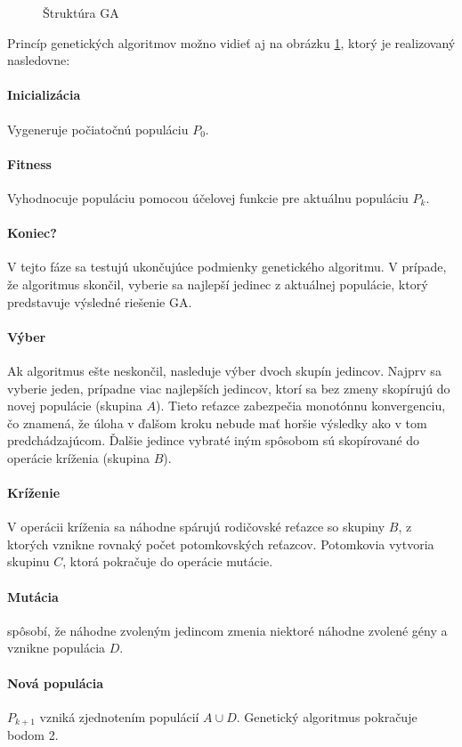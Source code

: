 \begin{figure}[!h]
  \centering
  
  \caption{Štruktúra GA}
  \label{img:ga}
\end{figure}


Princíp genetických algoritmov možno vidieť aj na obrázku \ref{img:ga}, ktorý je realizovaný nasledovne:
\paragraph{Inicializácia} Vygeneruje počiatočnú populáciu $ P_0 $.
\paragraph{Fitness} Vyhodnocuje populáciu pomocou účelovej funkcie pre aktuálnu populáciu $ P_k $.
\paragraph{Koniec?} V tejto fáze sa testujú ukončujúce podmienky genetického algoritmu.
V prípade, že algoritmus skončil, vyberie sa najlepší jedinec z aktuálnej populácie, ktorý predstavuje výsledné riešenie GA.
\paragraph{Výber} Ak algoritmus ešte neskončil, nasleduje výber dvoch skupín jedincov. Najprv sa vyberie jeden, prípadne viac najlepších jedincov, ktorí sa bez zmeny skopírujú
do novej populácie (skupina $ A $). Tieto reťazce zabezpečia monotónnu konvergenciu, čo znamená, že úloha v ďalšom kroku nebude mať horšie výsledky ako v tom predchádzajúcom.
Ďalšie jedince vybraté iným spôsobom sú skopírované do operácie kríženia (skupina $ B $).
\paragraph{Kríženie} V operácii kríženia sa náhodne spárujú rodičovské reťazce so skupiny $ B $, z ktorých vznikne rovnaký počet potomkovských reťazcov.
Potomkovia vytvoria skupinu $ C $, ktorá pokračuje do operácie mutácie. 
\paragraph{Mutácia} spôsobí, že náhodne zvoleným jedincom zmenia niektoré náhodne zvolené gény a vznikne populácia $ D $.
\paragraph{Nová populácia} $ P_{k+1} $ vzniká zjednotením populácií $ A \cup D $. Genetický algoritmus pokračuje bodom 2.
  
